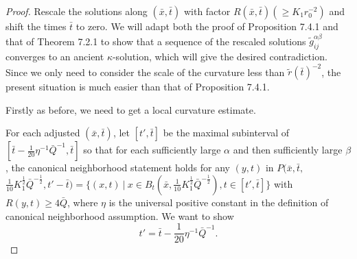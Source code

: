 \begin{proof}
Rescale the solutions along $(\bar{x},\bar{t})$ with factor
$R(\bar{x},\bar{t})(\geq K_1r^{-2}_0)$ and shift the times
$\bar{t}$ to zero. We will adapt both the proof of Proposition
7.4.1 and that of Theorem 7.2.1 to show that a sequence of the
rescaled solutions $\widetilde{g}_{ij}^{\alpha\beta}$ converges to
an ancient $\kappa$-solution, which will give the desired
contradiction. Since we only need to consider the scale of the
curvature less than $\widetilde{r}({\bar{t}})^{-2}$, the present
situation is much easier than that of Proposition 7.4.1.

Firstly as before, we need to get a local curvature estimate.

For each adjusted $(\bar x,\bar t)$, let $[t',\bar t]$ be the
maximal subinterval of $[\bar
t-\frac{1}{20}\eta^{-1}\bar{Q}^{-1},\bar t]$\; so\; that\; for\;
each\; sufficiently\; large $\alpha$ and then sufficiently large
$\beta$, the canonical neighborhood statement holds for any
$(y,t)$ in $P(\bar x,\bar t,$ $\frac{1}{10}K_1^{\frac{1}{2}}
\bar{Q}^{-\frac{1}{2}},t'-\bar t)=\{ ({x},{t}) \ |\ {x} \in
B_{{t}}(\bar
x,\frac{1}{10}K_1^{\frac{1}{2}}\bar{Q}^{-\frac{1}{2}}), {t} \in
[t',\bar{t}]\}$ with $R(y,t)\geq 4\bar{Q}$, where $\eta$ is the
universal positive constant in the definition of canonical
neighborhood assumption. We want to show \begin{equation}
t' = \bar t-\frac{1}{20}\eta^{-1}\bar{Q}^{-1}. %
\end{equation}


\end{proof}
